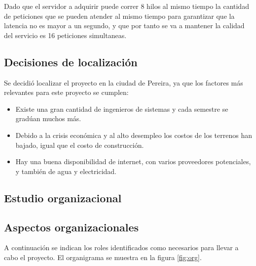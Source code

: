 \documentclass[a4paper, 12pt, oneside]{article}
\begin{document}
	Dado que el servidor a adquirir puede correr 8 hilos al mismo tiempo la cantidad de peticiones que se pueden atender al mismo tiempo para garantizar que la latencia no es mayor a un segundo, y que por tanto se va a mantener la calidad del servicio es 16 peticiones simultaneas.	
	
	\subsection{Decisiones de localización}
	Se decidió localizar el proyecto en la ciudad de Pereira, ya que los factores más relevantes para este proyecto se cumplen: 

	\begin{itemize}
	 \item Existe una gran cantidad de ingenieros de sistemas y cada semestre se gradúan muchos más.
	 \item Debido a la crisis económica y al alto desempleo los costos de los terrenos han bajado, igual que el costo de construcción.
	 \item Hay una buena disponibilidad de internet, con varios proveedores potenciales, y también de agua y electricidad.
	\end{itemize}
	\clearpage
	
	\begin{center}
	\section{Estudio organizacional}
	\end{center}
	
	\subsection{Aspectos organizacionales}

	A continuación se indican los roles identificados como necesarios para llevar a cabo el proyecto. El organigrama se muestra en la figura \ref{fig:org}.
\end{document}
